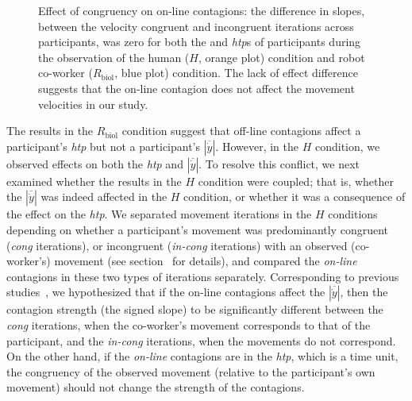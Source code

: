 \documentclass[a4paper, 12pt, oneside]{Thesis}  %
\begin{document}
\begin{figure}[t]
	\caption{Effect of congruency on on-line contagions: the difference in slopes, between the velocity congruent and incongruent iterations across participants, was zero for both the  and \textit{htp}s of participants during the observation of the human ($\textit{H}$, orange plot) condition and robot co-worker ($\textit{R}_{\text{biol}}$, blue plot) condition. The lack of effect difference suggests that the on-line contagion does not affect the movement velocities in our study.}
	\label{fig:cong}
\end{figure}

The results in the $R_{\text{biol}}$ condition suggest that off-line contagions affect a participant's {\it htp} but not a participant's $|\overline{\dot{y}}|$. However, in the $H$ condition, we observed effects on both the {\it htp} and $|\overline{\dot{y}}|$. To resolve this conflict, we next examined whether the results in the $H$ condition were coupled; that is, whether the $|\overline{\dot{y}}|$ was indeed affected in the $H$ condition, or whether it was a consequence of the effect on the {\it htp}. We separated movement iterations in the $H$ conditions depending on whether a participant's movement was predominantly congruent ({\it cong} iterations), or incongruent ({\it in-cong} iterations) with an observed (co-worker's) movement (see section~ for details), and compared the {\it on-line} contagions in these two types of iterations separately. Corresponding to previous studies~\cite{Noy:B&C:2009, Kilner:SocialNeuro:2007, Bisio:PlosOne:2010}, we hypothesized that if the on-line contagions affect the $|\overline{\dot{y}}|$, then the contagion strength (the signed slope) to be significantly different between the {\it cong} iterations, when the co-worker's movement corresponds to that of the participant, and the {\it in-cong} iterations, when the movements do not correspond. On the other hand, if the {\it on-line} contagions are in the {\it htp}, which is a time unit, the congruency of the observed movement (relative to the participant's own movement) should not change the strength of the contagions.
\end{document}
